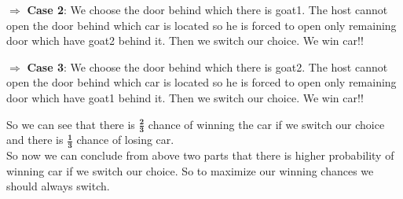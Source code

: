 \documentclass{beamer}
\begin{document}
$\Rightarrow$ \textbf{Case 2}: We choose the door behind which there is goat1. The host cannot open the door behind which car is located so he is forced to open only remaining door which have goat2 behind it. Then we switch our choice. We win car!!
\begin{figure}
\begin{center}
    

   \end{center}
\end{figure} 


$\Rightarrow$ \textbf{Case 3}: We choose the door behind which there is goat2. The host cannot 
open the door behind which car is located so he is forced to open only remaining door which have goat1 behind it. Then we switch our choice. We win car!!
\begin{figure}
\begin{center}
    

      
   \end{center}
\end{figure} 





So we can see that there is $\frac{\textbf{2}}{\textbf{3}}$ chance of winning the car if we switch our choice and there is $\frac{\textbf{1}}{\textbf{3}}$ chance of losing car.\\

So now we can conclude from above two parts that there is higher probability of winning car if we switch our choice. So to maximize our winning chances we should always switch.
\end{document}
